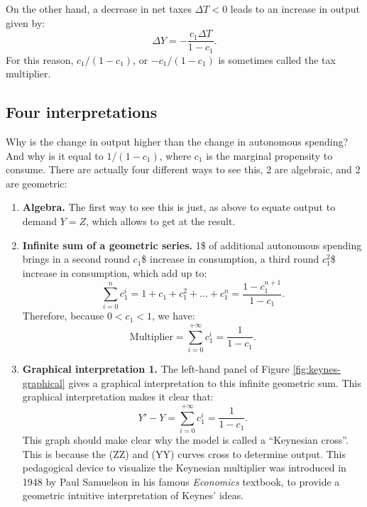 \documentclass[]{book}
\begin{document}
On the other hand, a decrease in net taxes \(\Delta T<0\) leads to an
increase in output given by:
\[\Delta Y = - \frac{c_1 \Delta T}{1-c_{1}}.\] For this reason,
\(c_1/(1-c_1)\), or \(-c_1/(1-c_1)\) is sometimes called the tax
multiplier.

\subsection{Four interpretations}\label{four-interpretations}

Why is the change in output higher than the change in autonomous
spending? And why is it equal to \(1/(1-c_1)\), where \(c_1\) is the
marginal propensity to consume. There are actually four different ways
to see this, 2 are algebraic, and 2 are geometric:

\begin{enumerate}
\def\labelenumi{\arabic{enumi}.}
\item
  \textbf{Algebra.} The first way to see this is just, as above to
  equate output to demand \(Y=Z\), which allows to get at the result.
\item
  \textbf{Infinite sum of a geometric series.} 1\$ of additional
  autonomous spending brings in a second round \(c_{1}\)\$ increase in
  consumption, a third round \(c_{1}^{2}\)\$ increase in consumption,
  which add up to:
  \[\sum_{i=0}^{n}c_{1}^{i}=1+c_{1}+c_{1}^{2}+...+c_{1}^{n}=\frac{1-c_{1}^{n+1}}{1-c_{1}}.\]
  Therefore, because \(0<c_{1}<1\), we have:
  \[\text{Multiplier}=\sum_{i=0}^{+\infty}c_{1}^{i}=\frac{1}{1-c_{1}}.\]
\item
  \textbf{Graphical interpretation 1.} The left-hand panel of Figure
  \ref{fig:keynes-graphical} gives a graphical interpretation to this
  infinite geometric sum. This graphical interpretation makes it clear
  that: \[Y'-Y=\sum_{i=0}^{+\infty}c_{1}^{i}=\frac{1}{1-c_{1}}.\] This
  graph should make clear why the model is called a ``Keynesian cross''.
  This is because the (ZZ) and (YY) curves cross to determine output.
  This pedagogical device to visualize the Keynesian multiplier was
  introduced in 1948 by Paul Samuelson in his famous \emph{Economics}
  textbook, to provide a geometric intuitive interpretation of Keynes'
  ideas.
\end{enumerate}
\end{document}
